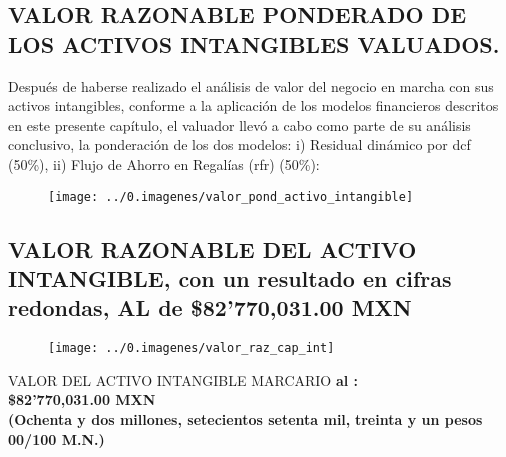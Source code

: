 \subsection{VALOR RAZONABLE PONDERADO DE LOS ACTIVOS INTANGIBLES VALUADOS.}

Despu\'es de haberse realizado el an\'alisis de valor del negocio en marcha con sus activos intangibles, conforme a la aplicaci\'on de los modelos financieros descritos en este presente cap\'itulo, el valuador llev\'o a cabo como parte de su an\'alisis conclusivo, la ponderaci\'on de los dos modelos: i) Residual din\'amico por \gls{dcf} (50\%), ii) Flujo de Ahorro en Regal\'ias (\gls{rfr}) (50\%):

\begin{figure}[H]
\centering
\texttt{[image: ../0.imagenes/valor\_pond\_activo\_intangible]}
\end{figure}

\subsection{VALOR RAZONABLE DEL ACTIVO INTANGIBLE, con un resultado en cifras redondas, AL \fechaValoresCorto{} de \$82'770,031.00 MXN}

\begin{figure}[H]
\centering
\texttt{[image: ../0.imagenes/valor\_raz\_cap\_int]}
\end{figure}


\begin{center}
\textcolor{principal}{VALOR DEL ACTIVO INTANGIBLE MARCARIO}
\textcolor{principal}{\textbf{\marca{} al \fechaValoresCorto:}}\\

\textcolor{principal}{\textbf{\$82'770,031.00 MXN}} \\
\textcolor{principal}{\textbf{(Ochenta y dos millones, setecientos setenta mil,}}
\textcolor{principal}{\textbf{treinta y un pesos 00/100 M.N.)}}

\end{center}

